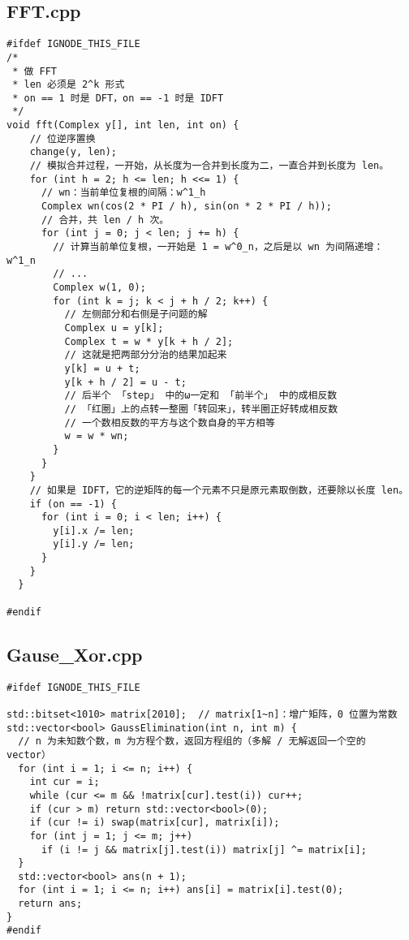 \documentclass[UTF8, a4paper, titlepage, twoside]{ctexart}
\begin{document}
\subsection{FFT.cpp}
\begin{verbatim}
#ifdef IGNODE_THIS_FILE
/*
 * 做 FFT
 * len 必须是 2^k 形式
 * on == 1 时是 DFT，on == -1 时是 IDFT
 */
void fft(Complex y[], int len, int on) {
    // 位逆序置换
    change(y, len);
    // 模拟合并过程，一开始，从长度为一合并到长度为二，一直合并到长度为 len。
    for (int h = 2; h <= len; h <<= 1) {
      // wn：当前单位复根的间隔：w^1_h
      Complex wn(cos(2 * PI / h), sin(on * 2 * PI / h));
      // 合并，共 len / h 次。
      for (int j = 0; j < len; j += h) {
        // 计算当前单位复根，一开始是 1 = w^0_n，之后是以 wn 为间隔递增： w^1_n
        // ...
        Complex w(1, 0);
        for (int k = j; k < j + h / 2; k++) {
          // 左侧部分和右侧是子问题的解
          Complex u = y[k];
          Complex t = w * y[k + h / 2];
          // 这就是把两部分分治的结果加起来
          y[k] = u + t;
          y[k + h / 2] = u - t;
          // 后半个 「step」 中的ω一定和 「前半个」 中的成相反数
          // 「红圈」上的点转一整圈「转回来」，转半圈正好转成相反数
          // 一个数相反数的平方与这个数自身的平方相等
          w = w * wn;
        }
      }
    }
    // 如果是 IDFT，它的逆矩阵的每一个元素不只是原元素取倒数，还要除以长度 len。
    if (on == -1) {
      for (int i = 0; i < len; i++) {
        y[i].x /= len;
        y[i].y /= len;
      }
    }
  }

#endif
\end{verbatim}

\subsection{Gause_Xor.cpp}
\begin{verbatim}
#ifdef IGNODE_THIS_FILE

std::bitset<1010> matrix[2010];  // matrix[1~n]：增广矩阵，0 位置为常数
std::vector<bool> GaussElimination(int n, int m) { 
  // n 为未知数个数，m 为方程个数，返回方程组的（多解 / 无解返回一个空的 vector）
  for (int i = 1; i <= n; i++) {
    int cur = i;
    while (cur <= m && !matrix[cur].test(i)) cur++;
    if (cur > m) return std::vector<bool>(0);
    if (cur != i) swap(matrix[cur], matrix[i]);
    for (int j = 1; j <= m; j++)
      if (i != j && matrix[j].test(i)) matrix[j] ^= matrix[i];
  }
  std::vector<bool> ans(n + 1);
  for (int i = 1; i <= n; i++) ans[i] = matrix[i].test(0);
  return ans;
}
#endif
\end{verbatim}
\end{document}
